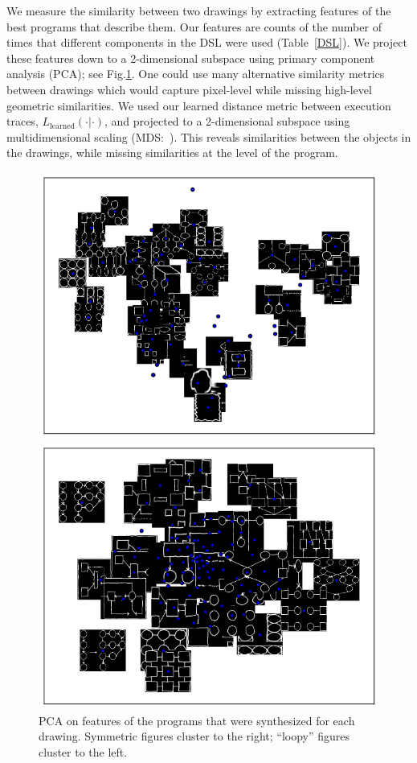 \documentclass{article}
\begin{document}
We measure the similarity between two drawings by extracting features
of the best programs that describe them. Our features are counts of the number of times that different components in the
DSL were used (Table~\ref{DSL}).  We project these features down to a
2-dimensional subspace using primary component analysis
(PCA); see Fig.\ref{NMF}.  One could use many
alternative similarity metrics between drawings which would capture pixel-level while missing high-level geometric similarities.
We used our learned distance metric between execution traces, $L_{\text{learned}}(\cdot|\cdot)$, and projected to a 2-dimensional subspace using multidimensional scaling (MDS:~\cite{cox2008multidimensional}). This reveals similarities between the objects in the drawings,
while missing similarities at the level of the program.
\begin{figure}
  \begin{minipage}{0.48\textwidth}
    \includegraphics[width = \textwidth]{figures/PCA.png}
    \caption{PCA on features of the programs that were synthesized for each drawing. Symmetric figures cluster to the right; ``loopy'' figures cluster to the left.}    \label{NMF}
  \end{minipage}\hfill
  \begin{minipage}{0.48\textwidth}
    \includegraphics[width = \textwidth]{figures/imageSimilarity.png} 

\end{minipage}
\end{figure}
\end{document}
